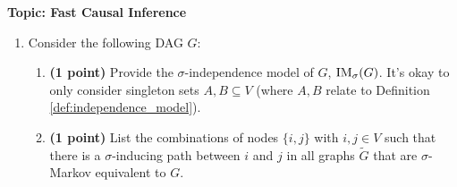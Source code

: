 
\flushleft\textbf{Topic: Fast Causal Inference}

\begin{enumerate}
\item Consider the following DAG $G$:
\begin{center}
\end{center}

\begin{enumerate}
	\item \textbf{(1 point)} Provide the $\sigma$-independence model of $G$, $\mathrm{IM}_\sigma(G)$. It's okay to only consider singleton sets $A, B\subseteq V$ (where $A,B$ relate to Definition \ref*{def:independence_model}).
	
	\item \textbf{(1 point)} List the combinations of nodes $\{i,j\}$ with $i,j\in V$ such that there is a $\sigma$-inducing path between $i$ and $j$ in all graphs $\tilde{G}$ that are $\sigma$-Markov equivalent to $G$.
	

\end{enumerate}
\end{enumerate}
